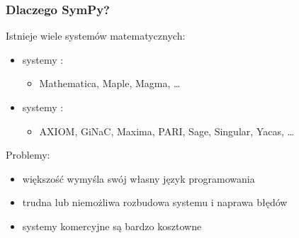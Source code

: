 \documentclass[10pt]{beamer}
\begin{document}
\begin{frame}[fragile]
  \frametitle{Dlaczego SymPy?}

  Istnieje wiele systemów matematycznych:
  \begin{itemize}
    \item systemy :
      \begin{itemize}
        \item Mathematica, Maple, Magma, \ldots
      \end{itemize}
    \item systemy :
      \begin{itemize}
        \item AXIOM, GiNaC, Maxima, PARI, Sage, Singular, Yacas, \ldots
      \end{itemize}
  \end{itemize}
  \pause
  {\color{red} Problemy:}
  \begin{itemize}
    \item większość wymyśla swój własny język programowania
    \item trudna lub niemożliwa rozbudowa systemu i naprawa błędów
    \item systemy komercyjne są bardzo kosztowne
  \end{itemize}
\end{frame}
\end{document}
